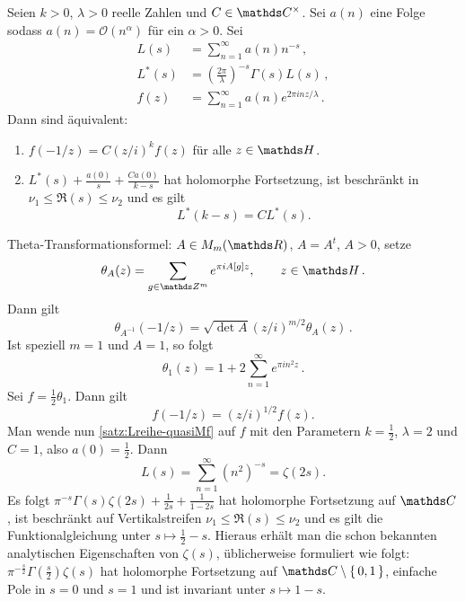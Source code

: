 \begin{satz}\label{satz:Lreihe-quasiMf}
	Seien $k > 0$, $\lambda >0$ reelle Zahlen und $C \in \CC^\times$. Sei $a(n)$ eine Folge sodass $a(n) = \mathcal O(n^\alpha)$ für ein $\alpha > 0$. Sei
	\begin{align*}
	L(s) &= \sum_{n=1}^\infty a(n)n^{-s}\,,\\
	L^*(s) &= \left( \frac{2\pi}{\lambda}\right)^{-s} \Gamma(s) L(s)\,,\\
	f(z) &= \sum_{n=1}^\infty a(n)e^{2\pi i nz/\lambda}\,.
	\end{align*}
	Dann sind äquivalent: 
	\begin{enumerate}
		\item $f(-1/z) = C (z/i)^{k} f(z)$ für alle $z \in \HH$.
		\item $L^*(s) + \frac{a(0)}{s} + \frac{Ca(0)}{k - s}$ hat holomorphe Fortsetzung, ist beschränkt in $\nu_1 \leq \Re(s) \leq \nu_2$ und es gilt 
		\[L^*(k - s) = C L^*(s).\]
	\end{enumerate}
\end{satz}


\begin{bsp}
	Theta-Transformationsformel: $A \in M_m(\RR)$, $A = A^t$, $A > 0$, setze
	\[
	\theta_A(z) = \sum_{g \in \ZZ^m} e^{\pi i A[g] z}, \qquad z \in \HH\,.
	\]
	Dann gilt 
	\[
	\theta_{A^{-1}}(-1/z) = \sqrt{\det A} (z / i)^{m/2} \theta_A(z)\,.
	\]
	Ist speziell $m=1$ und $A = 1$, so folgt 
	\[
	\theta_1(z) = 1 + 2\sum_{n=1}^\infty e^{\pi i n^2 z}\,.
	\]
	Sei $f = \frac12 \theta_1$. Dann gilt
	\[
	f(-1/z) = (z/i)^{1/2} f(z).
	\]
	Man wende nun \autoref{satz:Lreihe-quasiMf} auf $f$ mit den Parametern $k = \frac12$, $\lambda = 2$ und $C = 1$, also $a(0) = \frac12$. Dann
	\[
	L(s) = \sum_{n=1}^\infty (n^{2})^{-s} = \zeta(2s).
	\]
	Es folgt $\pi^{-s} \Gamma(s)\zeta(2s) + \frac{1}{2s} + \frac{1}{1-2s}$ hat holomorphe Fortsetzung auf $\CC$, ist beschränkt auf Vertikalstreifen $\nu_1 \leq \Re(s) \leq \nu_2$ und es gilt die Funktionalgleichung unter $s \mapsto \frac12 - s$. Hieraus erhält man die schon bekannten analytischen Eigenschaften von $\zeta(s)$, üblicherweise formuliert wie folgt: $\pi^{- \frac s2}\Gamma(\frac s2)\zeta(s)$ hat holomorphe Fortsetzung auf $\CC \setminus \Set {0,1}$, einfache Pole in $s=0$ und $s=1$ und ist invariant  unter $s \mapsto 1 - s$.
\end{bsp} 